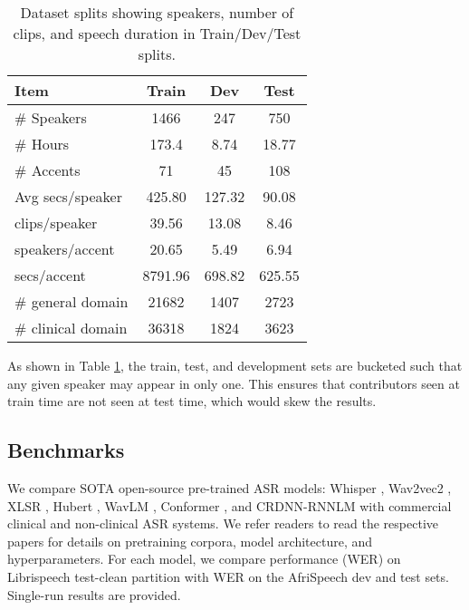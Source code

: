 \documentclass[11pt,a4paper]{article}
\begin{document}
\begin{table}
\small
\centering
\begin{tabular}{l|c|c|c}
\hline
\textbf{Item} & \textbf{Train} & \textbf{Dev}  & \textbf{Test}\\
\hline

\# Speakers & 1466 & 247 & 750 \\
\#  Hours & 173.4 & 8.74 & 18.77 \\
\#  Accents & 71 & 45 & 108 \\
Avg secs/speaker & 425.80 & 127.32 & 90.08 \\
clips/speaker & 39.56 & 13.08 & 8.46 \\
speakers/accent & 20.65 & 5.49 & 6.94 \\
secs/accent & 8791.96 & 698.82 & 625.55 \\
\# general domain & 21682 & 1407 & 2723 \\
\# clinical domain & 36318 & 1824 & 3623 \\

\hline
\end{tabular}
\caption{Dataset splits showing speakers, number of clips, and speech duration in Train/Dev/Test splits.}
\label{tab:splits}
\end{table}

As shown in Table \ref{tab:splits}, the train, test, and development sets are bucketed such that any given speaker may appear in only one. This ensures that contributors seen at train time are not seen at test time, which would skew the results. %


\subsection{Benchmarks}

We compare SOTA open-source pre-trained ASR models: Whisper \citep{radford2022robust}, Wav2vec2 \citep{Baevski2020wav2vec2A}, XLSR \citep{Babu2022XLSRSC}, Hubert \citep{hsu2021hubert}, WavLM \citep{chen2022wavlm}, Conformer  \citep{gulati2020conformer}, and CRDNN-RNNLM \citep{ravanelli2021speechbrain} with commercial clinical and non-clinical ASR systems. We refer readers to read the respective papers for details on pretraining corpora, model architecture, and hyperparameters. For each model, we compare performance (WER) on Librispeech test-clean partition \citep{panayotov2015librispeech} with WER on the AfriSpeech dev and test sets. Single-run results are provided.
\end{document}
